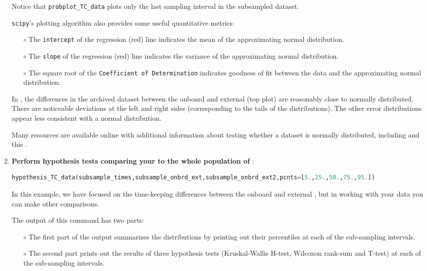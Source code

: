 \begin{enumerate}
	\smallskip
	Notice that \lstinline{probplot_TC_data} plots only the last sampling interval in the subsampled dataset. 
	
	\smallskip
	\texttt{scipy}'s plotting algorithm also provides some useful quantitative metrics:
	\begin{itemize}
		\item[$\circ$] The \texttt{intercept} of the regression (red) line indicates the mean of the approximating normal distribution.
		\item[$\circ$] The \texttt{slope} of the regression (red) line indicates the variance of the approximating normal distribution.
		\item[$\circ$] The square root of the \texttt{Coefficient of Determination} indicates goodness of fit between the data and the approximating normal distribution.
	\end{itemize}
	
	
	In , the differences in the archived dataset between the onboard and external \rtcs (top plot) are reasonably close to normally distributed.
	There are noticeable deviations at the left and right sides (corresponding to the tails of the distributions). 
	The other error distributions appear less consistent with a normal distribution.
	
	Many resources are available online with additional information about testing whether a dataset is normally distributed, including  and this .
	
	 

	\item \textbf{Perform hypothesis tests comparing your \rtc to the whole population of \rtcs}:
\begin{lstlisting}[language=Python]
hypothesis_TC_data(subsample_times,subsample_onbrd_ext,subsample_onbrd_ext2,pcnts=[5.,25.,50.,75.,95.])
\end{lstlisting}
	In this example, we have focused on the time-keeping differences between the onboard and external \rtcs, but in working with your data you can make other comparisons.

	\smallskip
	The output of this command has two parts:
	\begin{itemize}
		\item[$\circ$] The first part of the output summarizes the distributions by printing out their percentiles at each of the sub-sampling intervals.
		\item[$\circ$] The second part prints out the results of three hypothesis tests (Kruskal-Wallis H-test, Wilcoxon rank-sum and T-test) at each of the sub-sampling intervals.
		

\end{itemize}
\end{enumerate}
